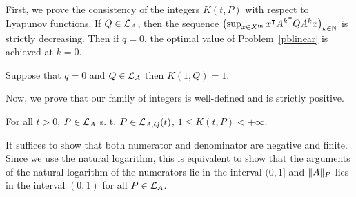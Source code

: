 \documentclass[10pt]{llncs}
\begin{document}
First, we prove the consistency of the integers $K(t,P)$ with respect to Lyapunov functions. If $Q\in\mathcal{L}_{A}$, then the sequence $\left(\sup_{x\in X^\mathrm{in}} x^\intercal {A^k}^\intercal Q A^k x\right)_{k\in\mathbb{N}}$ is strictly decreasing. Then if $q=0$, the optimal value of Problem~\eqref{pblinear} is achieved at $k=0$. 
\begin{prop}
\label{lyapunovbigk}
Suppose that $q=0$ and $Q\in\mathcal{L}_{A}$ then $K(1,Q)=1$.  
\end{prop}


Now, we prove that our family of integers is well-defined and is strictly positive.

\begin{prop}
For all $t>0$, $P\in \mathcal{L}_{A}$ s. t. $P\in \mathcal{L}_{A,Q}(t)$, $1\leq K(t,P)< +\infty$.  
\end{prop}

It suffices to show that both numerator and denominator are negative and finite. Since we use the natural logarithm, this is equivalent to show that the arguments of the natural logarithm of the numerators lie in the interval $(0,1]$ and $\| A\|_P$ lies in the interval $(0,1)$ for all $P\in\mathcal{L}_{A}$. 
\end{document}
